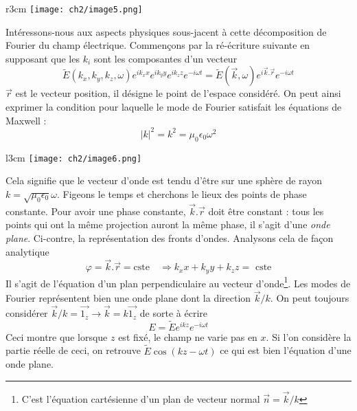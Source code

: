 \begin{wrapfigure}[9]{r}{3cm}
\texttt{[image: ch2/image5.png]}
\end{wrapfigure}
Intéressons-nous aux aspects physiques sous-jacent à cette décomposition de Fourier du champ 
électrique. Commençons par la ré-écriture suivante en supposant que les $k_i$ sont les 
composantes d'un vecteur
\begin{equation}
\tilde{E}(k_x,k_y,k_z,\omega)e^{ik_xx}e^{ik_yy}e^{ik_zz}e^{-i\omega t} = \tilde{E}(\vec{k},
\omega)e^{i\vec{k}.\vec{r}}e^{-i\omega t}
\end{equation}
\danger $\vec{r}$ est le vecteur position, il désigne le point de l'espace considéré. On peut 
ainsi exprimer la condition pour laquelle le mode de Fourier satisfait les équations de Maxwell  :
\begin{equation}
|k|^2 = k^2 = \mu_0\epsilon_0\omega^2
\end{equation}

\begin{wrapfigure}[9]{l}{3cm}
\vspace{-6mm}
\texttt{[image: ch2/image6.png]}
\end{wrapfigure}
Cela signifie que le vecteur d'onde est tendu d'être sur une sphère de rayon $k=
\sqrt{\mu_0\epsilon_0}\omega$. Figeons le temps et cherchons le lieux des points de phase 
constante. Pour avoir une phase constante, $\vec{k}.\vec{r}$ doit être constant : tous les 
points qui ont la même projection auront la même phase, il s'agit d'une \textit{onde plane}.
Ci-contre, la représentation des fronts d'ondes. Analysons cela de façon analytique
\begin{equation}
\varphi = \vec{k}.\vec{r} = \text{cste}\quad \Rightarrow k_xx+k_yy+k_zz = \text{ cste}
\end{equation}
Il s'agit de l’équation d'un plan perpendiculaire au vecteur d'onde\footnote{C'est l'équation cartésienne d'un plan de vecteur normal $\vec{n}=\vec{k}/k$}. Les modes de Fourier 
représentent bien une onde plane dont la direction $\vec{k}/k$. On peut toujours considérer 
$\vec{k}/k = \vec{1_z} \rightarrow \vec{k}= k\vec{1_z}$ de sorte à écrire
\begin{equation}
E = \tilde{E}e^{ikz}e^{-i\omega t}
\end{equation}
Ceci montre que lorsque $z$ est fixé, le champ ne varie pas en $x$. Si l'on considère la 
partie réelle de ceci, on retrouve $\tilde{E}\cos(kz-\omega t)$ ce qui est bien l'équation 
d'une onde plane.\\

